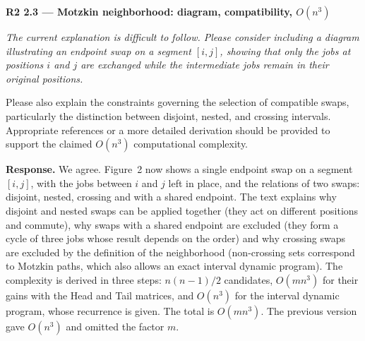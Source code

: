 \documentclass[12pt]{article}
\newenvironment{rc}[1]{\par\medskip\noindent\textbf{#1}\par\nopagebreak\noindent\itshape\renewcommand{\emph}[1]{\textbf{##1}}\ignorespaces}{\par}
\newcommand{\answer}[1]{\par\smallskip\noindent\textbf{Response.} #1\par}
\begin{document}
\begin{rc}{R2 2.3 --- Motzkin neighborhood: diagram, compatibility, $O(n^3)$}
The current explanation is difficult to follow. Please consider including a diagram illustrating an endpoint swap on a segment $[i,j]$, showing that only the jobs at positions $i$ and $j$ are exchanged while the intermediate jobs remain in their original positions.

Please also explain the constraints governing the selection of compatible swaps, particularly the distinction between disjoint, nested, and crossing intervals. Appropriate references or a more detailed derivation should be provided to support the claimed $O(n^3)$ computational complexity.
\end{rc}
\answer{We agree. Figure~2 now shows a single endpoint swap on a segment $[i,j]$, with the jobs between $i$ and $j$ left in place, and the relations of two swaps: disjoint, nested, crossing and with a shared endpoint. The text explains why disjoint and nested swaps can be applied together (they act on different positions and commute), why swaps with a shared endpoint are excluded (they form a cycle of three jobs whose result depends on the order) and why crossing swaps are excluded by the definition of the neighborhood (non-crossing sets correspond to Motzkin paths, which also allows an exact interval dynamic program). The complexity is derived in three steps: $n(n-1)/2$ candidates, $O(mn^3)$ for their gains with the Head and Tail matrices, and $O(n^3)$ for the interval dynamic program, whose recurrence is given. The total is $O(mn^3)$. The previous version gave $O(n^3)$ and omitted the factor $m$.}
\end{document}
